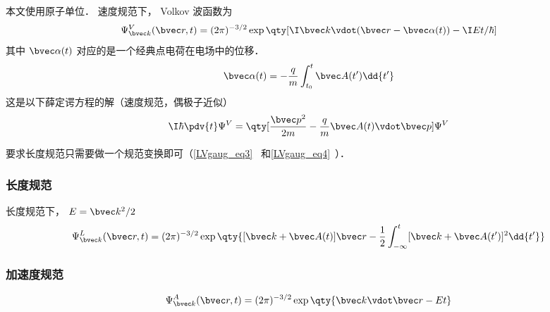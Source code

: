 
\begin{issues}
\issueDraft
\issueMissDepend
\end{issues}


本文使用原子单位． 速度规范下， Volkov 波函数为
\begin{equation}
\Psi_{\bvec k}^V(\bvec r, t) = (2\pi)^{-3/2} \exp\qty[\I \bvec k \vdot (\bvec r - \bvec \alpha(t)) - \I Et/\hbar]
\end{equation}
其中 $\bvec \alpha(t)$ 对应的是一个经典点电荷在电场中的位移．
\begin{equation}
\bvec \alpha(t) = -\frac{q}{m} \int_{t_0}^t \bvec A(t') \dd{t'}
\end{equation}
这是以下薛定谔方程的解（速度规范，偶极子近似）
\begin{equation}
\I\hbar \pdv{t} \Psi^V = \qty[\frac{\bvec p^2}{2m} - \frac{q}{m}\bvec A(t) \vdot \bvec p] \Psi^V
\end{equation}

要求长度规范只需要做一个规范变换即可（\autoref{LVgaug_eq3}~ 和\autoref{LVgaug_eq4}~）．

\subsubsection{长度规范}
长度规范下，  $E = \bvec k^2/2$
\begin{equation}
\Psi_{\bvec k}^L(\bvec r, t) = (2\pi)^{-3/2} \exp\qty{[\bvec k + \bvec A(t)]\bvec r - \frac{1}{2}\int_{-\infty}^t [\bvec k + \bvec A(t')]^2 \dd{t'}}
\end{equation}

\subsubsection{加速度规范}
\begin{equation}
\Psi_{\bvec k}^A(\bvec r, t) = (2\pi)^{-3/2} \exp\qty{\bvec k \vdot \bvec r - Et}
\end{equation}
